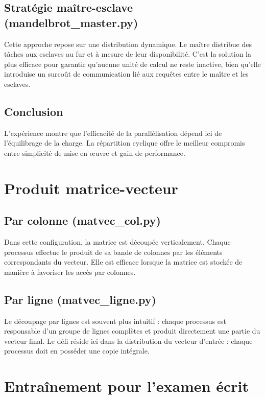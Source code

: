 \documentclass{article}
\begin{document}
\subsection{Stratégie maître-esclave (mandelbrot\_master.py)}

Cette approche repose sur une distribution dynamique. Le maître distribue des tâches aux esclaves au fur et à mesure de leur disponibilité. C'est la solution la plus efficace pour garantir qu'aucune unité de calcul ne reste inactive, bien qu'elle introduise un surcoût de communication lié aux requêtes entre le maître et les esclaves. 

\subsection{Conclusion}

L'expérience montre que l'efficacité de la parallélisation dépend ici de l'équilibrage de la charge. La répartition cyclique offre le meilleur compromis entre simplicité de mise en œuvre et gain de performance.

\section{Produit matrice-vecteur}

\subsection{Par colonne (matvec\_col.py)}

Dans cette configuration, la matrice est découpée verticalement. Chaque processus effectue le produit de sa bande de colonnes par les éléments correspondants du vecteur. Elle est efficace lorsque la matrice est stockée de manière à favoriser les accès par colonnes.

\subsection{Par ligne (matvec\_ligne.py)}

Le découpage par lignes est souvent plus intuitif : chaque processus est responsable d'un groupe de lignes complètes et produit directement une partie du vecteur final. Le défi réside ici dans la distribution du vecteur d'entrée : chaque processus doit en posséder une copie intégrale. 

\section{Entraînement pour l'examen écrit}
\end{document}
